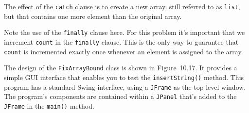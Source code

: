 \noindent The effect of the {\tt catch} clause is to create a new
array, still referred to as {\tt list}, but that contains one more
element than the original array.

Note the use of the {\tt finally} clause here.  For this problem it's
important that we increment {\tt count} in the {\tt finally}
clause.  This is the only way to guarantee that {\tt count} is
incremented exactly once whenever an element is assigned to the array.


The design of the {\tt FixArrayBound} class is shown in
Figure~10.17. It provides a simple GUI interface that enables you to
test the {\tt insertString()} method. This program has a standard
Swing interface, using a {\tt JFrame} as the top-level window.  The
program's components are contained within a {\tt JPanel} that's added
to the {\tt JFrame} in the {\tt main()} method.

\begin{figure}[b]
\end{figure}

